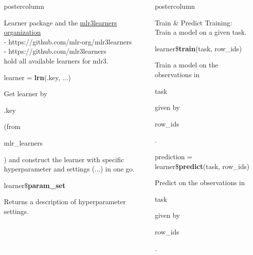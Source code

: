 \documentclass{beamer}
\newlength{\columnheight} %
\newcommand{\codeinline}[1]{\begin{codeboxinline}#1\end{codeboxinline}}
\begin{document}
\begin{frame}[fragile]{}
\begin{columns}
\begin{column}{.245\textwidth}
\begin{beamercolorbox}[center]{postercolumn}
\begin{minipage}{.98\textwidth}
{\begin{myblock}{Learner}
{						package} and the \href{https://github.com/mlr3learners}{mlr3learners
						organization} \\
						- https://github.com/mlr-org/mlr3learners \\
						- https://github.com/mlr3learners \\
						hold all available learners for {mlr3}.
						\vspace{1em}
						\\
						\begin{codebox}
							learner = \textbf{lrn}(.key, ...)
						\end{codebox}
						Get learner by \codeinline{.key} (from \codeinline{mlr\_learners}) and construct the learner with specific hyperparameter and settings (...) in one go.
						\\
						\vspace{1em}
						\begin{codebox}
							learner\$\textbf{param\_set}
						\end{codebox}
						Returns a description of hyperparameter settings.
					\end{myblock}
						\vfill
					}
				\end{minipage}
			\end{beamercolorbox}
		\end{column}
		\begin{column}{.245\textwidth}
			\begin{beamercolorbox}[center]{postercolumn}
				\begin{minipage}{.98\textwidth}
					\parbox[t][\columnheight]{\textwidth}{
						\begin{myblock}{Train \& Predict}
							Training: Train a model on a given task.
							\vspace{1em}
							\\
							\begin{codebox}
								learner\$\textbf{train}(task, row\_ids)
							\end{codebox}
							Train a model on the observations in \codeinline{task} given by \codeinline{row\_ids}.
							\\
							\begin{codebox}
								prediction = learner\$\textbf{predict}(task, row\_ids)
							\end{codebox}
							Predict on the observations in \codeinline{task} given by \codeinline{row\_ids}.
							\\
							\vspace{1em}
							\begin{codebox}

\end{codebox}
\end{myblock}}
\end{minipage}
\end{beamercolorbox}
\end{column}
\end{columns}
\end{frame}
\end{document}
